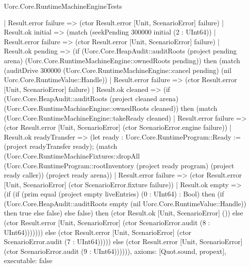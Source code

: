 \begin{lexlean}{Uorc.Core.RuntimeMachineEngineTests}
\begin{semanticmodule}
{    | Result.error failure => (ctor Result.error [Unit, ScenarioError] failure)
    | Result.ok initial => (match (seekPending 300000 initial (2 : UInt64))
      | Result.error failure => (ctor Result.error [Unit, ScenarioError] failure)
      | Result.ok pending => (if (Uorc.Core.HeapAudit::auditRoots (project pending arena) (Uorc.Core.RuntimeMachineEngine::ownedRoots pending)) then (match (auditDrive 300000 (Uorc.Core.RuntimeMachineEngine::cancel pending) (nil Uorc.Core.RuntimeValue::Handle))
        | Result.error failure => (ctor Result.error [Unit, ScenarioError] failure)
        | Result.ok cleaned => (if (Uorc.Core.HeapAudit::auditRoots (project cleaned arena) (Uorc.Core.RuntimeMachineEngine::ownedRoots cleaned)) then (match (Uorc.Core.RuntimeMachineEngine::takeReady cleaned)
          | Result.error failure => (ctor Result.error [Unit, ScenarioError] (ctor ScenarioError.engine failure))
          | Result.ok readyTransfer => (let ready : Uorc.Core.RuntimeProgram::Ready := (project readyTransfer ready); (match (Uorc.Core.RuntimeMachineFixtures::dropAll (Uorc.Core.RuntimeProgram::rootInventory (project ready program) (project ready caller)) (project ready arena))
            | Result.error failure => (ctor Result.error [Unit, ScenarioError] (ctor ScenarioError.fixture failure))
            | Result.ok empty => (if (if (prim equal (project empty liveEntries) (0 : UInt64) : Bool) then (if (Uorc.Core.HeapAudit::auditRoots empty (nil Uorc.Core.RuntimeValue::Handle)) then true else false) else false) then (ctor Result.ok [Unit, ScenarioError] ()) else (ctor Result.error [Unit, ScenarioError] (ctor ScenarioError.audit (8 : UInt64))))))) else (ctor Result.error [Unit, ScenarioError] (ctor ScenarioError.audit (7 : UInt64))))) else (ctor Result.error [Unit, ScenarioError] (ctor ScenarioError.audit (9 : UInt64)))))),
  axioms: [Quot.sound, propext],
  executable: false
}


\end{semanticmodule}
\end{lexlean}
